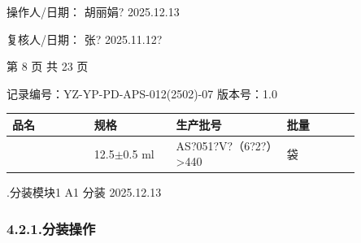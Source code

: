 \documentclass[UTF8,10pt,a4paper,fontset=fandol]{ctexart}
\newcommand{\fieldvalue}[1]{#1}
\newcommand{\handwritten}[1]{#1}
\begin{document}
\vspace{0.5em}

操作人/日期：
\fieldvalue{\handwritten{胡丽娟?}}
\quad
\fieldvalue{\handwritten{2025.12.13}}

\hspace{2em}
复核人/日期：
\fieldvalue{\handwritten{张?}}
\quad
\fieldvalue{\handwritten{2025.11.12?}}

\begin{center}
第 8 页 共 23 页
\end{center}

\newpage

\noindent 记录编号：YZ-YP-PD-APS-012(2502)-07 \quad 版本号：1.0

\begin{center}
\begin{tabular}{|p{0.20\linewidth}|p{0.20\linewidth}|p{0.27\linewidth}|p{0.18\linewidth}|}
\hline
品名 & 规格 & 生产批号 & 批量\\
\hline
\text{--} & 12.5$\pm$0.5 ml &
\fieldvalue{\handwritten{AS?051?V?（6?2?）>440}} &
袋\\
\hline
\end{tabular}
\end{center}

.\quad 分装模块1\quad
\handwritten{A1}\quad
\handwritten{分装}\quad
\handwritten{2025.12.13}

\subsubsection*{4.2.1.\quad 分装操作}
\end{document}
